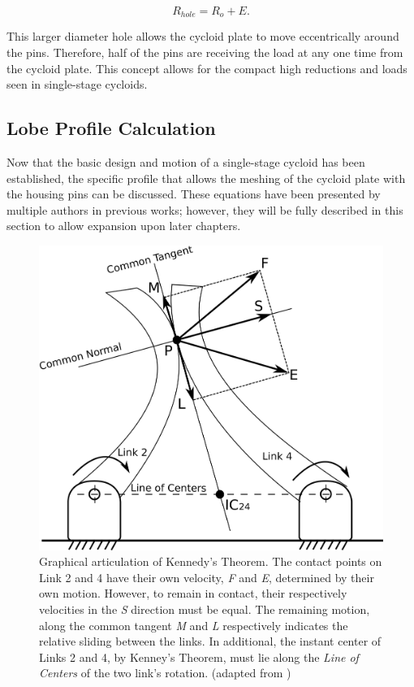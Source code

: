 \begin{equation} \label{eq:pin_hole_diam}
R_{hole} = R_o + E.
\end{equation}

This larger diameter hole allows the cycloid plate to move eccentrically around the pins. Therefore, half of the pins are receiving the load at any one time from the cycloid plate. This concept allows for the compact high reductions and loads seen in single-stage cycloids. 

\subsection{Lobe Profile Calculation} \label{ch:design:basic_calc:profile}

Now that the basic design and motion of a single-stage cycloid has been established, the specific profile that allows the meshing of the cycloid plate with the housing pins can be discussed. These equations have been presented by multiple authors in previous works; however, they will be fully described in this section to allow expansion upon later chapters. 

\begin{figure}[!b]
   \centering
   \includegraphics[width=0.60\linewidth]{fig/kennedy_sliding}
   \caption{Graphical articulation of Kennedy's Theorem. The contact points on Link 2 and 4 have their own velocity, \textit{F} and \textit{E}, determined by their own motion. However, to remain in contact, their respectively velocities in the \textit{S} direction must be equal. The remaining motion, along the common tangent \textit{M} and \textit{L} respectively indicates the relative sliding between the links. In additional, the instant center of Links 2 and 4, by Kenney's Theorem, must lie along the \textit{Line of Centers} of the two link's rotation. (adapted from \cite{ref:kinematics_and_dynamics})}
   \label{fig:kennedy_sliding}
\end{figure}

